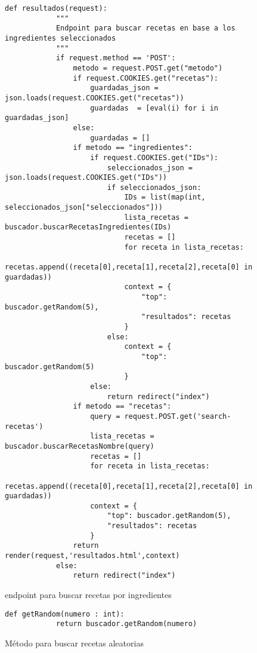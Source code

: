 \begin{figure}[H]
    \begin{lstlisting}[style=consola]
        def resultados(request):
            """
            Endpoint para buscar recetas en base a los ingredientes seleccionados
            """
            if request.method == 'POST':
                metodo = request.POST.get("metodo")
                if request.COOKIES.get("recetas"):
                    guardadas_json = json.loads(request.COOKIES.get("recetas"))
                    guardadas  = [eval(i) for i in guardadas_json]
                else:
                    guardadas = []
                if metodo == "ingredientes":
                    if request.COOKIES.get("IDs"):
                        seleccionados_json = json.loads(request.COOKIES.get("IDs"))
                        if seleccionados_json:
                            IDs = list(map(int, seleccionados_json["seleccionados"]))
                            lista_recetas = buscador.buscarRecetasIngredientes(IDs)
                            recetas = []
                            for receta in lista_recetas:
                                recetas.append((receta[0],receta[1],receta[2],receta[0] in guardadas))
                            context = {
                                "top": buscador.getRandom(5),
                                "resultados": recetas
                            }
                        else:
                            context = {
                                "top": buscador.getRandom(5)
                            }
                    else:
                        return redirect("index")
                if metodo == "recetas":
                    query = request.POST.get('search-recetas')
                    lista_recetas = buscador.buscarRecetasNombre(query)
                    recetas = []
                    for receta in lista_recetas:
                        recetas.append((receta[0],receta[1],receta[2],receta[0] in guardadas))
                    context = {
                        "top": buscador.getRandom(5),
                        "resultados": recetas
                    }
                return render(request,'resultados.html',context)
            else:
                return redirect("index")
    \end{lstlisting}
    \caption{\gls{endpoint} para buscar recetas por ingredientes}
    \label{sni:django-recetasIngredientes}
\end{figure}

\begin{figure}[H]
    \begin{lstlisting}[style=consola]
        def getRandom(numero : int):
            return buscador.getRandom(numero)
    \end{lstlisting}
    \caption{Método para buscar recetas aleatorias}
    \label{sni:django-aleatorias}
\end{figure}

